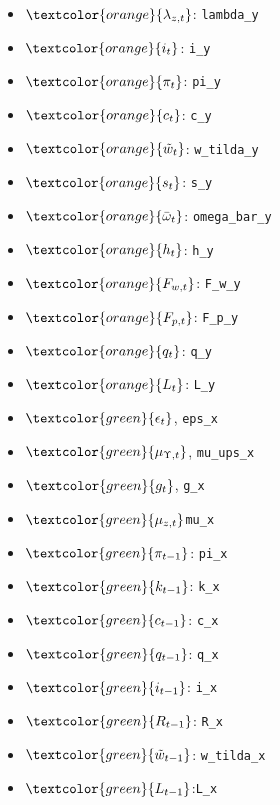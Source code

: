 \begin{itemize}
    \item $ \textcolor{orange}{\lambda_{z,t}} $: \texttt{lambda\_y} 
    \item $ \textcolor{orange}{i_t} $: \texttt{i\_y}
    \item $ \textcolor{orange}{\pi_t}  $: \texttt{pi\_y}
    \item $ \textcolor{orange}{c_t} $: \texttt{c\_y}
    \item $ \textcolor{orange}{\tilde{w}_t} $: \texttt{w\_tilda\_y}
    \item $ \textcolor{orange}{s_t} $: \texttt{s\_y}
    \item $ \textcolor{orange}{\bar{\omega}_t} $: \texttt{omega\_bar\_y}
    \item $ \textcolor{orange}{h_t} $: \texttt{h\_y}
    \item $ \textcolor{orange}{F_{w,t}} $: \texttt{F\_w\_y}
    \item $\textcolor{orange}{F_{p,t}} $: \texttt{F\_p\_y}
    \item $\textcolor{orange}{q_t} $: \texttt{q\_y}
    \item $\textcolor{orange}{L_t} $: \texttt{L\_y}
\end{itemize}

\begin{itemize}
    \item $\textcolor{green}{\epsilon_t}$,  \texttt{eps\_x}
    \item $\textcolor{green}{\mu_{\Upsilon,t}}$, \texttt{mu\_ups\_x}
    \item $\textcolor{green}{g_t}$,  \texttt{g\_x}
    \item $\textcolor{green}{\mu_{z,t}}$\texttt{mu\_x}
    \item $\textcolor{green}{\pi_{t-1}}$: \texttt{pi\_x} 
    \item $\textcolor{green}{k_{t-1}}$: \texttt{k\_x} 
    \item $\textcolor{green}{c_{t-1}}$: \texttt{c\_x} 
    \item $\textcolor{green}{q_{t-1}}$: \texttt{q\_x} 
    \item $\textcolor{green}{i_{t-1}}$: \texttt{i\_x} 
    \item $\textcolor{green}{R_{t-1}}$: \texttt{R\_x} 
    \item $\textcolor{green}{\tilde{w}_{t-1}}$: \texttt{w\_tilda\_x} 
    \item $\textcolor{green}{L_{t-1}}$:\texttt{L\_x} 
\end{itemize}

